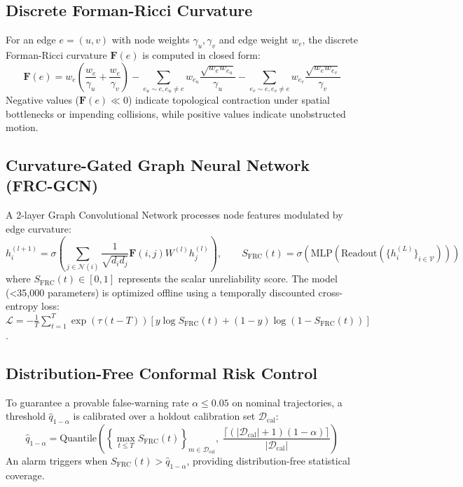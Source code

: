 \documentclass[10pt,a4paper]{article}
\begin{document}
\subsection{Discrete Forman-Ricci Curvature}
For an edge $e = (u, v)$ with node weights $\gamma_u, \gamma_v$ and edge weight $w_e$, the discrete Forman-Ricci curvature $\mathbf{F}(e)$ is computed in closed form:
\begin{equation}
\mathbf{F}(e) = w_e \left( \frac{w_e}{\gamma_u} + \frac{w_e}{\gamma_v} \right) - \sum_{e_u \sim e, e_u \neq e} w_{e_u} \frac{\sqrt{w_e w_{e_u}}}{\gamma_u} - \sum_{e_v \sim e, e_v \neq e} w_{e_v} \frac{\sqrt{w_e w_{e_v}}}{\gamma_v}
\end{equation}
Negative values ($\mathbf{F}(e) \ll 0$) indicate topological contraction under spatial bottlenecks or impending collisions, while positive values indicate unobstructed motion.

\subsection{Curvature-Gated Graph Neural Network (FRC-GCN)}
A 2-layer Graph Convolutional Network processes node features modulated by edge curvature:
\begin{equation}
h_i^{(l+1)} = \sigma \left( \sum_{j \in \mathcal{N}(i)} \frac{1}{\sqrt{d_i d_j}} \mathbf{F}(i, j) W^{(l)} h_j^{(l)} \right), \qquad
S_{\text{FRC}}(t) = \sigma \left( \text{MLP} \left( \text{Readout}(\{h_i^{(L)}\}_{i \in \mathcal{V}}) \right) \right)
\end{equation}
where $S_{\text{FRC}}(t) \in [0, 1]$ represents the scalar unreliability score. The model (<35,000 parameters) is optimized offline using a temporally discounted cross-entropy loss: $\mathcal{L} = -\frac{1}{T}\sum_{t=1}^T \exp(\tau(t - T)) [y \log S_{\text{FRC}}(t) + (1-y)\log(1 - S_{\text{FRC}}(t))]$.

\subsection{Distribution-Free Conformal Risk Control}
To guarantee a provable false-warning rate $\alpha \le 0.05$ on nominal trajectories, a threshold $\hat{q}_{1-\alpha}$ is calibrated over a holdout calibration set $\mathcal{D}_{\text{cal}}$:
\begin{equation}
\hat{q}_{1-\alpha} = \text{Quantile} \left( \left\{ \max_{t \le T} S_{\text{FRC}}(t) \right\}_{m \in \mathcal{D}_{\text{cal}}}, \; \frac{\lceil (|\mathcal{D}_{\text{cal}}| + 1)(1 - \alpha) \rceil}{|\mathcal{D}_{\text{cal}}|} \right)
\end{equation}
An alarm triggers when $S_{\text{FRC}}(t) > \hat{q}_{1-\alpha}$, providing distribution-free statistical coverage.
\end{document}
